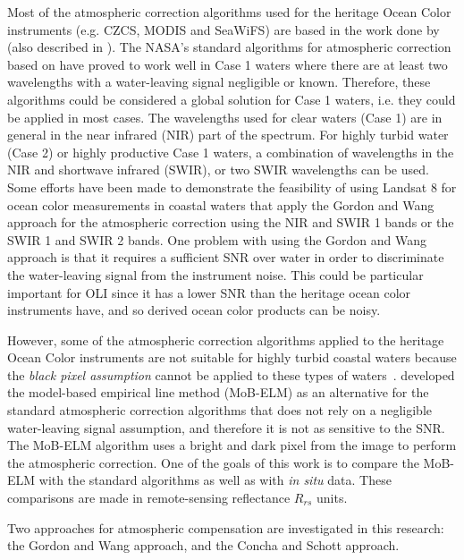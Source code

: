 Most of the atmospheric correction algorithms used for the heritage Ocean Color instruments (e.g. CZCS, MODIS and SeaWiFS) are based in the work done by \cite{Gordon:1994} (also described in \cite{Gordon:1997}). The NASA's standard algorithms for atmospheric correction based on \cite{Gordon:1994} have proved to work well in Case 1 waters where there are at least two wavelengths with a water-leaving signal negligible or known. Therefore, these algorithms could be considered a global solution for Case 1 waters, i.e. they could be applied in most cases. The wavelengths used for clear waters (Case 1) are in general in the near infrared (NIR) part of the spectrum. For highly turbid water (Case 2) or highly productive Case 1 waters, a combination of wavelengths in the NIR and shortwave infrared (SWIR), or two SWIR wavelengths can be used\cite{Wang:2007,Wang:2007dz,Wang2009}. Some efforts have been made to demonstrate the feasibility of using Landsat 8 for ocean color measurements in coastal waters that apply the Gordon and Wang approach\cite{Vanhellemont2014a,Vanhellemont2014,Vanhellemont:2015,Franz:2015} for the atmospheric correction using the NIR and SWIR 1 bands or the SWIR 1 and SWIR 2 bands. One problem with using the Gordon and Wang approach is that it requires a sufficient SNR over water in order to discriminate the water-leaving signal from the instrument noise. This could be particular important for OLI since it has a lower SNR than the heritage ocean color instruments have, and so derived ocean color products can be noisy.

However, some of the atmospheric correction algorithms applied to the heritage Ocean Color instruments are not suitable for highly turbid coastal waters because the {\it black pixel assumption} cannot be applied to these types of waters~\cite{Patt2003}. \cite{Concha2014SPIE} developed the model-based empirical line method (MoB-ELM) as an alternative for the standard atmospheric correction algorithms that does not rely on a negligible water-leaving signal assumption, and therefore it is not as sensitive to the SNR. The MoB-ELM algorithm uses a bright and dark pixel from the image to perform the atmospheric correction. One of the goals of this work is to compare the MoB-ELM with the standard algorithms as well as with {\it in situ} data. These comparisons are made in remote-sensing reflectance $R_{rs}$ units. 

Two approaches for atmospheric compensation are investigated in this research: the Gordon and Wang approach, and the Concha and Schott approach.

